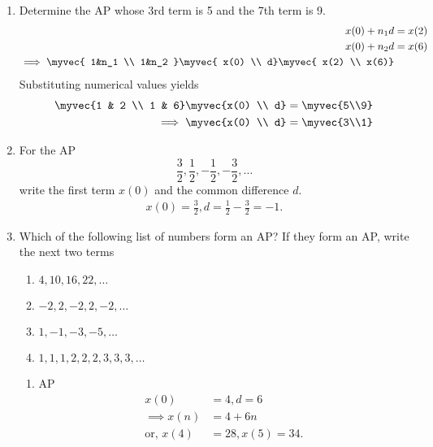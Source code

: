 \begin{enumerate}[label=\thesubsection.\arabic*, ref=\thesubsection.\theenumi]
\item Determine the AP whose 3rd term is 5 and the 7th term is 9.
	\\
	\solution
\begin{align}
	x(0)+n_1d &= x(2)
	\\
	x(0)+n_2d &= x(6)
	\\
	\implies 
	\myvec{
	1&n_1 
	\\
	1&n_2 
}
	\myvec{
x(0)
\\
	d}
	\myvec{
x(2)
\\
	x(6)}
       \end{align}
Substituting numerical values 
yields
\begin{align}
	\myvec{1 & 2 \\ 1 & 6}
	\myvec{x(0) \\ d}
	&=
	\myvec{5\\9}
	\\
	\implies \myvec{x(0) \\ d}
	&=
	\myvec{3\\1}
\end{align}
%
\item For the AP 
$$\frac{3}{2}, \frac{1}{2}, -\frac{1}{2}, -\frac{3}{2}, \dots $$ write the first term $x(0)$ and the common difference $d$.
\\
\solution
\begin{align}
	x(0) = \frac{3}{2}, d=  \frac{1}{2}-\frac{3}{2} = -1.
\end{align}
\item Which of the following list of numbers form an AP? If they form an AP, 
write the next two terms 
		\begin{multicols}{2}
\begin{enumerate}
\item $4, 10, 16, 22, \dots$ 
\item $-2, 2, -2, 2, -2, \dots$
\item $1, -1, -3, -5, \dots$ 
\item $1, 1, 1, 2, 2, 2, 3, 3, 3, \dots$
\end{enumerate}
\end{multicols}
\begin{enumerate}
	\item AP
\begin{align}
	x(0) &= 4, d = 6
	\\
	\implies x(n) &= 4 +6n
	\\
	\text{or, }x(4) &= 28, x(5) = 34.

\end{align}
\end{enumerate}
\end{enumerate}
